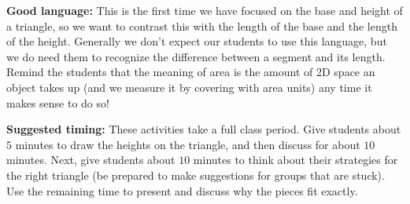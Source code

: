 \documentclass[nooutcomes,noauthor, handout]{ximera}
\begin{document}
\begin{instructorNotes}
{\bf Good language:} This is the first time we have focused on the base and height of a triangle, so we want to contrast this with the length of the base and the length of the height. Generally we don't expect our students to use this language, but we do need them to recognize the difference between a segment and its length. Remind the students that the meaning of area is the amount of 2D space an object takes up (and we measure it by covering with area units) any time it makes sense to do so!



{\bf Suggested timing:} These activities take a full class period. Give students about $5$ minutes to draw the heights on the triangle, and then discuss for about $10$ minutes. Next, give students about $10$ minutes to think about their strategies for the right triangle (be prepared to make suggestions for groups that are stuck). Use the remaining time to present and discuss why the pieces fit exactly.



\end{instructorNotes}
\end{document}
